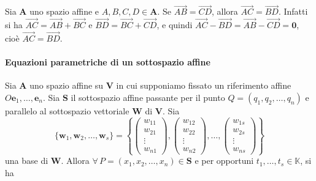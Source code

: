 \documentclass{article}
\theoremstyle{plain}
\theoremstyle{definition}
\theoremstyle{remark}
\begin{document}
\vspace{10pt}

Sia $\mathbf{A}$ uno spazio affine e $A,B,C,D\in\mathbf{A}$. Se $\overrightarrow{AB}=\overrightarrow{CD}$, allora $\overrightarrow{AC}=\overrightarrow{BD}$.
Infatti si ha $\overrightarrow{AC}=\overrightarrow{AB}+\overrightarrow{BC}$ e $\overrightarrow{BD}=\overrightarrow{BC}+\overrightarrow{CD}$, e quindi $\overrightarrow{AC}-\overrightarrow{BD}=\overrightarrow{AB}-\overrightarrow{CD}=\mathbf{0}$, cioè $\overrightarrow{AC}=\overrightarrow{BD}$.

\vspace{10pt}

\paragraph{Equazioni parametriche di un sottospazio affine}
Sia $\mathbf{A}$ uno spazio affine su $\mathbf{V}$ in cui supponiamo fissato un riferimento affine $O\mathbf{e}_1,\ldots,\mathbf{e}_n$.
Sia $\mathbf{S}$ il sottospazio affine passante per il punto $Q=(q_1,q_2,\ldots,q_n)$ e parallelo al sottospazio vettoriale $\mathbf{W}$ di $\mathbf{V}$.
Sia 
\[\{\mathbf{w}_1,\mathbf{w}_2,\ldots,\mathbf{w}_s\}=\left\{\begin{pmatrix}
    w_{11}\\
    w_{21}\\
    \vdots\\
    w_{n1}
\end{pmatrix},\begin{pmatrix}
    w_{12}\\
    w_{22}\\
    \vdots\\
    w_{n2}
\end{pmatrix},\dots,\begin{pmatrix}
    w_{1s}\\
    w_{2s}\\
    \vdots\\
    w_{ns}
\end{pmatrix}\right\}\] una base di $\mathbf{W}$.
Allora $\forall\,P=(x_1,x_2,\ldots,x_n)\in\mathbf{S}$ e per opportuni $t_1,\ldots,t_s\in\mathbb{K}$, si ha
\end{document}
